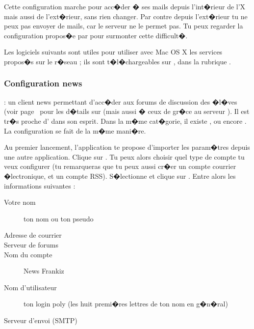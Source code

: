 Cette configuration marche pour acc�der � ses mails depuis l'int�rieur de l'X mais aussi de
l'ext�rieur, sans rien changer. Par contre depuis l'ext�rieur tu ne peux pas envoyer de mails, car
le serveur  ne le permet pas. Tu peux regarder la configuration propos�e par
 pour surmonter cette difficult�.



Les logiciels suivants sont utiles pour utiliser avec Mac OS X les services propos�s sur le r�seau ; ils sont t�l�chargeables sur ,
dans la rubrique .


\subsubsection{Configuration news}

  :
un client news permettant d'acc�der aux forums de discussion des
�l�ves
                   (voir page~\pageref{newsgroups} pour les d�tails sur 
                   (mais aussi � ceux de  gr�ce au serveur ).
Il est tr�s proche d' dans son esprit. Dans la
m�me cat�gorie, il existe ,  ou encore
. La configuration se fait de la m�me mani�re.

Au premier lancement, l'application te propose d'importer les
param�tres depuis une autre application. Clique sur . Tu peux alors choisir quel type de compte tu veux configurer (tu
remarqueras que tu peux aussi cr�er un compte courrier �lectronique,
et un compte RSS). S�lectionne  et
clique sur . Entre alors les informations suivantes
:

\begin{description}
  \item[Votre nom] ton nom ou ton pseudo
  \item[Adresse de courrier] 
  \item[Serveur de forums] 
  \item[Nom du compte] News Frankiz
  \item[Nom d'utilisateur] ton login poly (les huit premi�res lettres de ton nom en g�n�ral)
  \item[Serveur d'envoi (SMTP)] 
\end{description}

